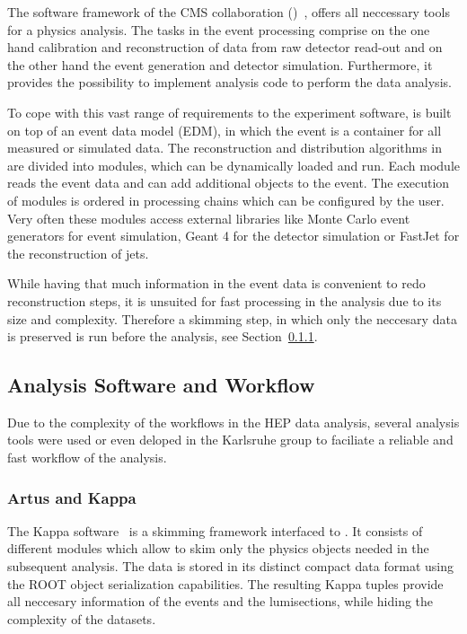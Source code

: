 The software framework of the CMS collaboration (\CMSSW)~\cite{Bayatyan:838359}, offers
all neccessary tools for a physics analysis. The tasks in the event processing
comprise on the one hand calibration and reconstruction of data from raw
detector read-out and on the other hand the event generation and detector
simulation. Furthermore, it provides the possibility to implement analysis code
to perform the data analysis. 

To cope with this vast range of requirements to the experiment software, \CMSSW
is built on top of an event data model (EDM), in which the event is a
container for all measured or simulated data. The reconstruction and
distribution algorithms in \CMSSW are divided into modules, which can be
dynamically loaded and run. Each module reads the event data and can add additional
objects to the event. The execution of modules is ordered
in processing chains which can be configured by the user. Very often these modules
access external libraries like Monte Carlo event generators for event
simulation, Geant 4 for the detector simulation or FastJet for the
reconstruction of jets. 

While having that much information in the event data is convenient to redo
reconstruction steps, it is unsuited for fast processing in the analysis due to
its size and complexity. Therefore a skimming step, in which only the neccesary
data is preserved is run before the analysis, see Section~\ref{artus_kappa}.

\subsection{Analysis Software and Workflow}

Due to the complexity of the workflows in the HEP data analysis, several
analysis tools were used or even deloped in the Karlsruhe group to faciliate a reliable and
fast workflow of the analysis. 

\subsubsection{Artus and Kappa}
\label{artus_kappa}

The Kappa software~\cite{Kappa:2015aa} is a skimming framework interfaced to
\CMSSW. It consists of different modules which allow to skim only the physics
objects needed in the subsequent analysis. The data is stored in its distinct
compact data format using the ROOT object serialization capabilities. The
resulting Kappa tuples provide all neccesary information of the events and the
lumisections, while hiding the complexity of the \CMSSW datasets.


